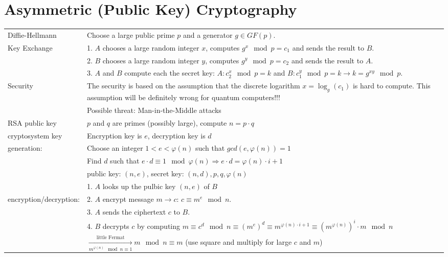 \section{Asymmetric (Public Key) Cryptography}
\label{sec::CrypCod_Asymmetric Crypto}
\begin{tabular}{|l| p{14.7cm}|}
	\hline
	Diffie-Hellmann				 	& 	Choose a large public prime $p$ and a generator $g \in GF(p)$.\\
	Key Exchange					&	1. $A$ chooses a large random integer $x$, computes $g^x \mod p = c_1$ and sends the result to $B$. \\
									&	2. $B$ chooses a large random integer $y$, computes $g^y \mod p = c_2$ and sends the result to $A$. \\
									&	3. $A$ and $B$ compute each the secret key: $A: c_2^x \mod p=k $ and $B: c_1^y \mod p=k \to k=g^{xy} \mod p$.\\
									\cline{2-2}
	Security        & 	The security is based on the assumption that the discrete logarithm $x=\log_{g}(c_1)$ is hard to compute. This assumption will be definitely wrong for quantum computers!!!\\
									& Possible threat: Man-in-the-Middle attacks\\
	\hline
	RSA public key 					&	$p$ and $q$ are primes (possibly large), compute $n=p\cdot q$\\
	cryptosystem key				& Encryption key is $e$, decryption key is $d$\\
	generation:						&	Choose an integer $1<e<\varphi(n)$ such that $gcd(e,\varphi(n))=1$\\
									&	Find $d$ such that $e\cdot d\equiv 1 \mod \varphi(n) \Rightarrow e\cdot d = \varphi(n) \cdot i + 1$\\
									&	public key: $(n,e)$, secret key: $(n,d), p,q, \varphi(n)$\\
									\cline{2-2}
									&	1. $A$ looks up the pulbic key $(n,e)$ of $B$\\
	encryption/decryption:			&	2. $A$ encrypt message $m \to c$: $c \equiv m^e \mod n$.\\
									&	3. $A$ sends the ciphertext $c$ to $B$.\\
									&	4. $B$ decrypts $c$ by computing $m\equiv c^d \mod n \equiv (m^{e})^d \equiv  m^{\varphi(n) \cdot i + 1} \equiv  \left(m^{\varphi(n)}\right)^i \cdot m \mod n$\\
									&	$\xrightarrow[m^{\varphi(n)} \mod n\equiv 1]{\text{little Fermat}} m \mod n \equiv m $  (use square and multiply for large $c$ and $m$)\\

\end{tabular}
